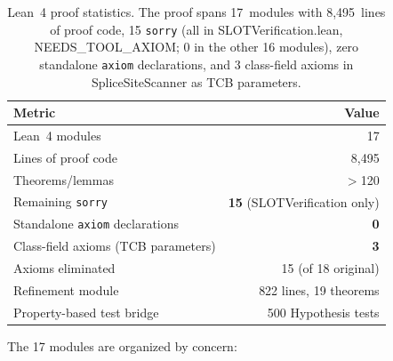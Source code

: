\documentclass[acmsmall,review,anonymous]{acmart}
\begin{document}
\begin{table}[t]
\centering
\caption{Lean~4 proof statistics. The proof spans 17~modules with
         8{,}495~lines of proof code, 15 \texttt{sorry} (all in SLOTVerification.lean, NEEDS\_TOOL\_AXIOM; 0 in the other 16 modules), zero standalone
         \texttt{axiom} declarations, and 3 class-field axioms in
         SpliceSiteScanner as TCB parameters.}
\label{tab:proofstats}
\begin{tabular}{lr}
\toprule
\textbf{Metric} & \textbf{Value} \\
\midrule
Lean~4 modules & 17 \\
Lines of proof code & 8{,}495 \\
Theorems/lemmas & $>$120 \\
Remaining \texttt{sorry} & \textbf{15} (SLOTVerification only) \\
Standalone \texttt{axiom} declarations & \textbf{0} \\
Class-field axioms (TCB parameters) & \textbf{3} \\
Axioms eliminated & 15 (of 18 original) \\
Refinement module & 822 lines, 19 theorems \\
Property-based test bridge & 500 Hypothesis tests \\
\bottomrule
\end{tabular}
\end{table}

The 17 modules are organized by concern:
\end{document}
